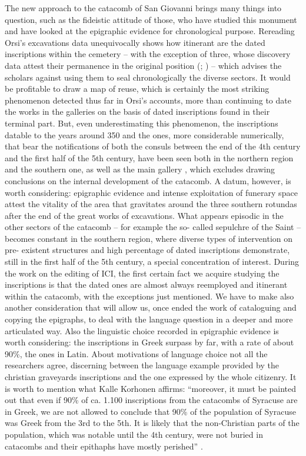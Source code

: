 \documentclass[amsthm,ebook]{saparticle}
\begin{document}
The new approach to the catacomb of San Giovanni brings many things into question, such as the fideistic attitude of those, who have studied this monument and have looked at the epigraphic evidence for chronological purpose. Rereading Orsi’s excavations data unequivocally shows how itinerant are the dated inscriptions within the cemetery – with the exception of three, whose discovery data attest their permanence in the original position (\citealp[43-50, 352-353]{ORSI1896}; \citealp[90, 97]{AGNELLO1953}) – which advises the scholars against using them to seal chronologically the diverse sectors. It would be profitable to draw a map of reuse, which is certainly the most striking phenomenon detected thus far in Orsi’s accounts, more than continuing to date the works in the galleries on the basis of dated inscriptions found in their terminal part. But, even underestimating this phenomenon, the inscriptions datable to the years around 350 and the ones, more considerable numerically, that bear the notifications of both the consuls between the end of the 4th century and the first half of the 5th century, have been seen both in the northern region and the southern one, as well as the main gallery \citep[109, n. 62]{SGARLATA1996}, which excludes drawing conclusions on the internal development of the catacomb. A datum, however, is worth considering: epigraphic evidence and intense exploitation of funerary space attest the vitality of the area that gravitates around the three southern rotundas after the end of the great works of excavations. What appears episodic in the other sectors of the catacomb – for example the so- called sepulchre of the Saint – becomes constant in the southern region, where diverse types of intervention on pre- existent structures and high percentage of dated inscriptions demonstrate, still in the first half of the 5th century, a special concentration of interest. During the work on the editing of ICI, the first certain fact we acquire studying the inscriptions is that the dated ones are almost always reemployed and itinerant within the catacomb, with the exceptions just mentioned. We have to make also another consideration that will allow us, once ended the work of cataloguing and copying the epigraphs, to deal with the language question in a deeper and more articulated way. Also the linguistic choice recorded in epigraphic evidence is worth considering: the inscriptions in Greek surpass by far, with a rate of about 90\%, the ones in Latin. About motivations of language choice not all the researchers agree, discerning between the language example provided by the christian graveyards inscriptions and the one expressed by the whole citizenry. It is worth to mention what Kalle Korhonen affirms: ``moreover, it must be painted out that even if 90\% of ca. 1.100 inscriptions from the catacombs of Syracuse are in Greek, we are not allowed to conclude that 90\% of the population of Syracuse was Greek from the 3rd to the 5th. It is likely that the non-Christian parts of the population, which was notable until the 4th century, were not buried in catacombs and their epithaphs have mostly perished'' \citep[124- 125]{KORHONEN2011}.
\end{document}
